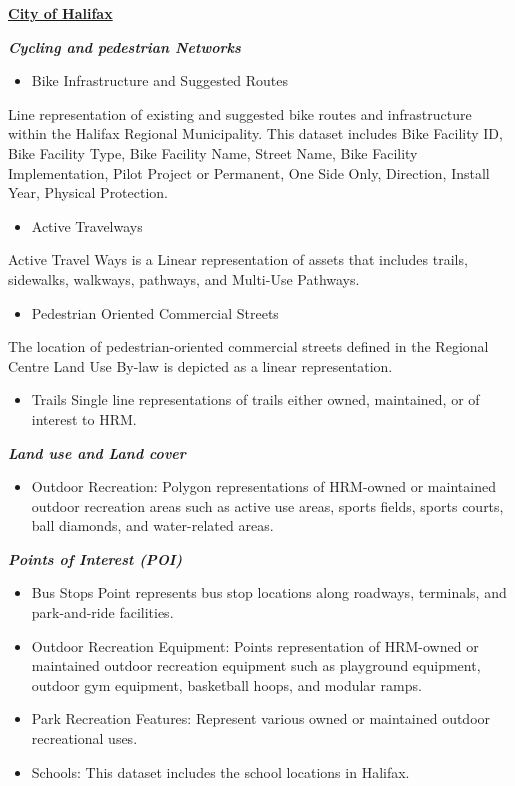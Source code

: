 \documentclass[
11pt, %
oneside, %
english, %
singlespacing, %
]{macthesis} %
\def\tightlist{}
\begin{document}
\textbf{\href{https://catalogue-hrm.opendata.arcgis.com/search?tags=Halifax\%20Open\%20Data}{City of Halifax}}

\textbf{\emph{Cycling and pedestrian Networks}}

\begin{itemize}
\tightlist
\item
  Bike Infrastructure and Suggested Routes
\end{itemize}

Line representation of existing and suggested bike routes and infrastructure within the Halifax Regional Municipality. This dataset includes Bike Facility ID, Bike Facility Type, Bike Facility Name, Street Name, Bike Facility Implementation, Pilot Project or Permanent, One Side Only, Direction, Install Year, Physical Protection.

\begin{itemize}
\tightlist
\item
  Active Travelways
\end{itemize}

Active Travel Ways is a Linear representation of assets that includes trails, sidewalks, walkways, pathways, and Multi-Use Pathways.

\begin{itemize}
\tightlist
\item
  Pedestrian Oriented Commercial Streets
\end{itemize}

The location of pedestrian-oriented commercial streets defined in the Regional Centre Land Use By-law is depicted as a linear representation.

\begin{itemize}
\tightlist
\item
  Trails Single line representations of trails either owned, maintained, or of interest to HRM.
\end{itemize}

\textbf{\emph{Land use and Land cover}}

\begin{itemize}
\tightlist
\item
  Outdoor Recreation: Polygon representations of HRM-owned or maintained outdoor recreation areas such as active use areas, sports fields, sports courts, ball diamonds, and water-related areas.
\end{itemize}

\textbf{\emph{Points of Interest (POI)}}

\begin{itemize}
\item
  Bus Stops Point represents bus stop locations along roadways, terminals, and park-and-ride facilities.
\item
  Outdoor Recreation Equipment: Points representation of HRM-owned or maintained outdoor recreation equipment such as playground equipment, outdoor gym equipment, basketball hoops, and modular ramps.
\item
  Park Recreation Features: Represent various owned or maintained outdoor recreational uses.
\item
  Schools: This dataset includes the school locations in Halifax.
\end{itemize}
\end{document}
